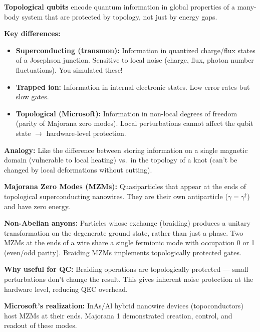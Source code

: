 \documentclass[11pt,a4paper]{article}
\begin{document}
\begin{answerbox}
\textbf{Topological qubits} encode quantum information in global properties of a many-body system that are protected by topology, not just by energy gaps.

\textbf{Key differences:}
\begin{itemize}
    \item \textbf{Superconducting (transmon):} Information in quantized charge/flux states of a Josephson junction. Sensitive to local noise (charge, flux, photon number fluctuations). You simulated these!
    \item \textbf{Trapped ion:} Information in internal electronic states. Low error rates but slow gates.
    \item \textbf{Topological (Microsoft):} Information in non-local degrees of freedom (parity of Majorana zero modes). Local perturbations cannot affect the qubit state $\to$ hardware-level protection.
\end{itemize}
\textbf{Analogy:} Like the difference between storing information on a single magnetic domain (vulnerable to local heating) vs.\ in the topology of a knot (can't be changed by local deformations without cutting).
\end{answerbox}

\begin{answerbox}
\textbf{Majorana Zero Modes (MZMs):} Quasiparticles that appear at the ends of topological superconducting nanowires. They are their own antiparticle ($\gamma = \gamma^\dagger$) and have zero energy.

\textbf{Non-Abelian anyons:} Particles whose exchange (braiding) produces a unitary transformation on the degenerate ground state, rather than just a phase. Two MZMs at the ends of a wire share a single fermionic mode with occupation 0 or 1 (even/odd parity). Braiding MZMs implements topologically protected gates.

\textbf{Why useful for QC:} Braiding operations are topologically protected --- small perturbations don't change the result. This gives inherent noise protection at the hardware level, reducing QEC overhead.

\textbf{Microsoft's realization:} InAs/Al hybrid nanowire devices (topoconductors) host MZMs at their ends. Majorana 1 demonstrated creation, control, and readout of these modes.
\end{answerbox}
\end{document}

